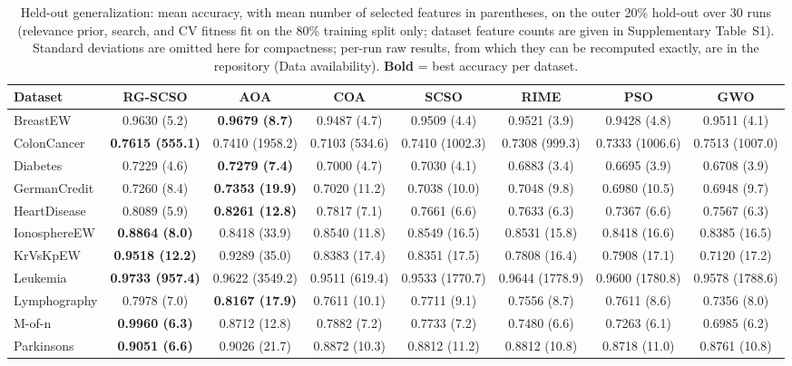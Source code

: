 \documentclass[preprint,3p,times]{elsarticle}
\begin{document}
\begin{table}[!tbp]
\centering
\caption{Held-out generalization: mean accuracy, with mean number of selected features in parentheses, on the outer 20\% hold-out over 30 runs (relevance prior, search, and CV fitness fit on the 80\% training split only; dataset feature counts are given in Supplementary Table~S1). Standard deviations are omitted here for compactness; per-run raw results, from which they can be recomputed exactly, are in the repository (Data availability). \textbf{Bold} = best accuracy per dataset.}
\label{tab:heldout}
\scriptsize
\setlength{\tabcolsep}{2pt}
\begin{tabular}{lccccccc}
\toprule
Dataset & RG-SCSO & AOA & COA & SCSO & RIME & PSO & GWO \\
\midrule
BreastEW & 0.9630 (5.2) & \textbf{0.9679 (8.7)} & 0.9487 (4.7) & 0.9509 (4.4) & 0.9521 (3.9) & 0.9428 (4.8) & 0.9511 (4.1) \\
ColonCancer & \textbf{0.7615 (555.1)} & 0.7410 (1958.2) & 0.7103 (534.6) & 0.7410 (1002.3) & 0.7308 (999.3) & 0.7333 (1006.6) & 0.7513 (1007.0) \\
Diabetes & 0.7229 (4.6) & \textbf{0.7279 (7.4)} & 0.7000 (4.7) & 0.7030 (4.1) & 0.6883 (3.4) & 0.6695 (3.9) & 0.6708 (3.9) \\
GermanCredit & 0.7260 (8.4) & \textbf{0.7353 (19.9)} & 0.7020 (11.2) & 0.7038 (10.0) & 0.7048 (9.8) & 0.6980 (10.5) & 0.6948 (9.7) \\
HeartDisease & 0.8089 (5.9) & \textbf{0.8261 (12.8)} & 0.7817 (7.1) & 0.7661 (6.6) & 0.7633 (6.3) & 0.7367 (6.6) & 0.7567 (6.3) \\
IonosphereEW & \textbf{0.8864 (8.0)} & 0.8418 (33.9) & 0.8540 (11.8) & 0.8549 (16.5) & 0.8531 (15.8) & 0.8418 (16.6) & 0.8385 (16.5) \\
KrVsKpEW & \textbf{0.9518 (12.2)} & 0.9289 (35.0) & 0.8383 (17.4) & 0.8351 (17.5) & 0.7808 (16.4) & 0.7908 (17.1) & 0.7120 (17.2) \\
Leukemia & \textbf{0.9733 (957.4)} & 0.9622 (3549.2) & 0.9511 (619.4) & 0.9533 (1770.7) & 0.9644 (1778.9) & 0.9600 (1780.8) & 0.9578 (1788.6) \\
Lymphography & 0.7978 (7.0) & \textbf{0.8167 (17.9)} & 0.7611 (10.1) & 0.7711 (9.1) & 0.7556 (8.7) & 0.7611 (8.6) & 0.7356 (8.0) \\
M-of-n & \textbf{0.9960 (6.3)} & 0.8712 (12.8) & 0.7882 (7.2) & 0.7733 (7.2) & 0.7480 (6.6) & 0.7263 (6.1) & 0.6985 (6.2) \\
Parkinsons & \textbf{0.9051 (6.6)} & 0.9026 (21.7) & 0.8872 (10.3) & 0.8812 (11.2) & 0.8812 (10.8) & 0.8718 (11.0) & 0.8761 (10.8) \\

\end{tabular}
\end{table}
\end{document}
